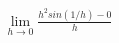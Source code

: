 \documentclass[preview]{standalone}
\begin{document}
\begin{align*}
\lim_{h\to 0} \frac{h^{2}sin(1/h)-0}{h}
\end{align*}
\end{document}
